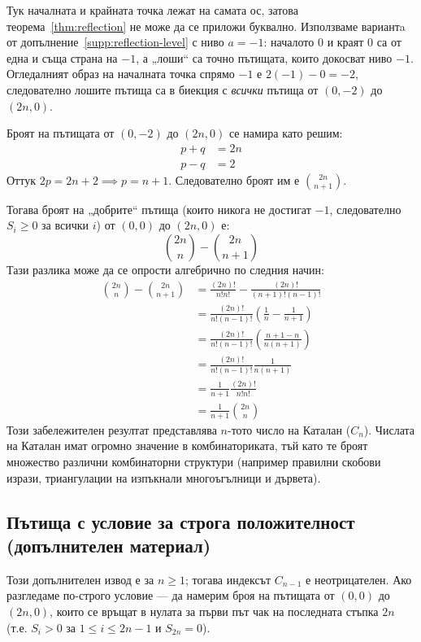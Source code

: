 Тук началната и крайната точка лежат на самата ос, затова теорема~\ref{thm:reflection}
не може да се приложи буквално. Използваме вариантa от допълнение~\ref{supp:reflection-level}
с ниво $a = -1$: началото $0$ и краят $0$ са от една и съща страна на $-1$, а „лоши“ са
точно пътищата, които докосват ниво $-1$. Огледалният образ на началната точка спрямо
$-1$ е $2(-1) - 0 = -2$, следователно лошите пътища са в биекция с \emph{всички} пътища
от $(0,-2)$ до $(2n,0)$.

Броят на пътищата от $(0,-2)$ до $(2n,0)$ се намира като решим:
\begin{align*}
p + q &= 2n \\
p - q &= 2
\end{align*}
Оттук $2p = 2n + 2 \implies p = n+1$. Следователно броят им е $\binom{2n}{n+1}$.

Тогава броят на „добрите“ пътища (които никога не достигат $-1$, следователно $S_i \geq 0$ за всички $i$) от $(0,0)$ до $(2n,0)$ е:
\[ \binom{2n}{n} - \binom{2n}{n+1} \]
Тази разлика може да се опрости алгебрично по следния начин:
\begin{align*}
\binom{2n}{n} - \binom{2n}{n+1} &= \frac{(2n)!}{n!n!} - \frac{(2n)!}{(n+1)!(n-1)!} \\
&= \frac{(2n)!}{n!(n-1)!} \left( \frac{1}{n} - \frac{1}{n+1} \right) \\
&= \frac{(2n)!}{n!(n-1)!} \left( \frac{n+1 - n}{n(n+1)} \right) \\
&= \frac{(2n)!}{n!(n-1)!} \frac{1}{n(n+1)} \\
&= \frac{1}{n+1} \frac{(2n)!}{n!n!} \\
&= \frac{1}{n+1} \binom{2n}{n}
\end{align*}
Този забележителен резултат представлява $n$-тото число на Каталан ($C_n$). Числата на Каталан имат огромно значение в комбинаториката, тъй като те броят множество различни комбинаторни структури (например правилни скобови изрази, триангулации на изпъкнали многоъгълници и дървета).

\subsection{Пътища с условие за строга положителност \textnormal{(допълнителен материал)}}
Този допълнителен извод е за $n\ge1$; тогава индексът $C_{n-1}$ е неотрицателен.
Ако разгледаме по-строго условие — да намерим броя на пътищата от $(0,0)$ до $(2n,0)$, които се връщат в нулата за първи път чак на последната стъпка $2n$ (т.е. $S_i > 0$ за $1 \leq i \leq 2n-1$ и $S_{2n} = 0$).

